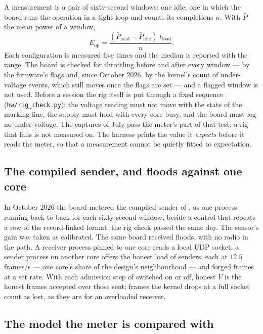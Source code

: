 A measurement is a pair of sixty-second windows: one idle, one in which the board runs the
operation in a tight loop and counts its completions $n$. With $\bar P$ the mean power of a
window,
\[
E_{\mathrm{op}} = \frac{(\bar P_{\mathrm{load}} - \bar P_{\mathrm{idle}})\; t_{\mathrm{load}}}{n} .
\]
Each configuration is measured five times and the median is reported with the range. The board
is checked for throttling before and after every window --- by the firmware's flags and, since
October 2026, by the kernel's count of under-voltage events, which still moves once the flags
are set --- and a flagged window is not used. Before a session the rig itself is put through a
fixed sequence (\texttt{hw/rig\_check.py}): the voltage reading must not move with the state of
the marking line, the supply must hold with every core busy, and the board must log no
under-voltage. The captures of July pass the meter's part of that test; a rig that fails is not
measured on. The harness prints the value it \emph{expects} before it reads the meter, so that a
measurement cannot be quietly fitted to expectation.

\subsection{The compiled sender, and floods against one core}

In October 2026 the board metered the compiled sender of , as one process
running back to back for each sixty-second window, beside a control that repeats a row of the
record-linked format; the rig check passed the same day. The sensor's gain was taken as calibrated.
The same board received floods, with no radio in the path. A receiver process pinned to one
core reads a local UDP socket; a sender process on another core offers the honest load of
\flSenders{} senders, each at $12.5$ frames/s --- one core's share of the design's neighbourhood
--- and forged frames at a set rate. With each admission step of  switched on
or off, honest $V$ is the honest frames accepted over those sent; frames the kernel drops at a
full socket count as lost, as they are for an overloaded receiver.

\subsection{The model the meter is compared with}

